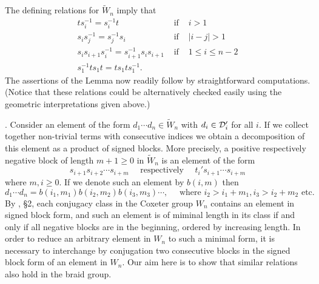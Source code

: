 \begin{pf} The defining relations for $\tilde{W}_n$ imply that
\begin{eqnarray*}
ts_i^{-1}=s_i^{-1}t & \mbox{  if } &  i>1 \\ s_is_j^{-1}=s_j^{-1}s_i &
\mbox{ if  } &  |i-j|>1 \\ s_is_{i+1}s_i^{-1}=s_{i+1}^{-1}s_is_{i+1} &
\mbox{ if  } & 1 \leq  i \leq n-2  \\ s_1^{-1}ts_1t=ts_1ts_1^{-1}. & &
\end{eqnarray*} The assertions   of  the Lemma now  readily  follow by
straightforward computations.   (Notice that these relations  could be
alternatively checked easily using the geometric interpretations given
above.) \end{pf}

. Consider an element of the form  $d_1 \cdots d_n \in \tilde{W}_n$
with   $d_i \in {\cal   D}_i'$ for  all $i$.   If  we collect together
non-trivial terms with consecutive  indices we obtain a  decomposition
of  this element  as  a product of  signed blocks.   More precisely, a
positive respectively  negative  block  of length   $m+1  \geq 0$   in
$\tilde{W}_n$ is an element of the form
\[s_{i+1}s_{i+2}\cdots s_{i+m} \quad \mbox{ respectively } \quad
t_i's_{i+1} \cdots s_{i+m}\] where  $m,i\geq 0$. If  we denote such an
element     by        $b(i,m)$       then           \[d_1       \cdots
d_n=b(i_1,m_1)b(i_2,m_2)b(i_3,m_3)      \cdots,  \quad  \mbox{ where }
i_2>i_1+m_1, i_3>i_2+m_2 \mbox{ etc}.\] By \cite{GP}, \S 2, each conjugacy 
class in the Coxeter group $W_n$ contains an element in signed block 
form, and such an element is of miminal length in its class if and only 
if all negative blocks are in the beginning, ordered by increasing length. 
In order to reduce an arbitrary element in $W_n$ to such a minimal form, 
it is necessary to interchange by conjugation two consecutive blocks in 
the signed block form of an element in $W_n$. Our aim here is to show 
that similar relations also hold in the braid group.

